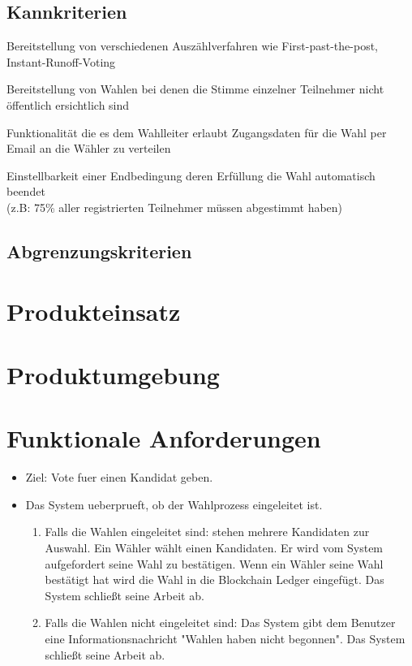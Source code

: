 \documentclass[parskip=full,11pt,twoside]{scrartcl}
\begin{document}
\subsection{Kannkriterien}

Bereitstellung von verschiedenen Auszählverfahren wie First-past-the-post, Instant-Runoff-Voting

Bereitstellung von Wahlen bei denen die Stimme einzelner Teilnehmer nicht öffentlich ersichtlich sind

Funktionalität die es dem Wahlleiter erlaubt Zugangsdaten für die Wahl per Email an die Wähler zu verteilen

Einstellbarkeit einer Endbedingung deren Erfüllung die Wahl automatisch beendet \\(z.B: 75\% aller registrierten Teilnehmer müssen abgestimmt haben)

\subsection{Abgrenzungskriterien}

\section{Produkteinsatz}

\section{Produktumgebung}

\section{Funktionale Anforderungen}

\begin{itemize}
	\item Ziel: Vote fuer einen Kandidat geben.
	\item Das System ueberprueft, ob der Wahlprozess eingeleitet ist.  
	\begin{enumerate}
		\item Falls die Wahlen eingeleitet sind: stehen mehrere Kandidaten zur Auswahl. Ein Wähler wählt einen Kandidaten. Er wird vom System aufgefordert seine Wahl zu bestätigen. Wenn ein Wähler seine Wahl bestätigt hat wird die Wahl in die Blockchain Ledger eingefügt. Das System schließt seine Arbeit ab.
		\item Falls die Wahlen nicht eingeleitet sind: Das System gibt dem Benutzer eine Informationsnachricht "Wahlen haben nicht begonnen". Das System schließt seine Arbeit ab.
	\end{enumerate}
\end{itemize}
\end{document}
